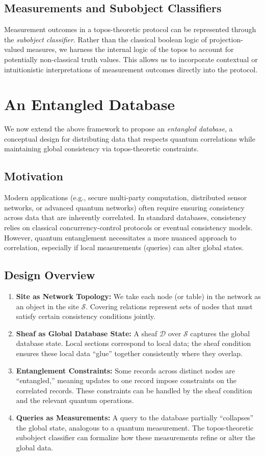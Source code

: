\documentclass[11pt]{article}
\begin{document}
\subsection{Measurements and Subobject Classifiers}
Measurement outcomes in a topos-theoretic protocol can be represented through the \emph{subobject classifier}. Rather than the classical boolean logic of projection-valued measures, we harness the internal logic of the topos to account for potentially non-classical truth values. This allows us to incorporate contextual or intuitionistic interpretations of measurement outcomes directly into the protocol.

\section{An Entangled Database}\label{sec:entangled_database}
We now extend the above framework to propose an \emph{entangled database}, a conceptual design for distributing data that respects quantum correlations while maintaining global consistency via topos-theoretic constraints.

\subsection{Motivation}
Modern applications (e.g., secure multi-party computation, distributed sensor networks, or advanced quantum networks) often require ensuring consistency across data that are inherently correlated. In standard databases, consistency relies on classical concurrency-control protocols or eventual consistency models. However, quantum entanglement necessitates a more nuanced approach to correlation, especially if local measurements (queries) can alter global states.

\subsection{Design Overview}
\begin{enumerate}[label=(\roman*)]
    \item \textbf{Site as Network Topology:} We take each node (or table) in the network as an object in the site $\mathcal{S}$. Covering relations represent sets of nodes that must satisfy certain consistency conditions jointly.
    \item \textbf{Sheaf as Global Database State:} A sheaf $\mathcal{D}$ over $\mathcal{S}$ captures the global database state. Local sections correspond to local data; the sheaf condition ensures these local data ``glue'' together consistently where they overlap.
    \item \textbf{Entanglement Constraints:} Some records across distinct nodes are ``entangled,'' meaning updates to one record impose constraints on the correlated records. These constraints can be handled by the sheaf condition and the relevant quantum operations.
    \item \textbf{Queries as Measurements:} A query to the database partially ``collapses'' the global state, analogous to a quantum measurement. The topos-theoretic subobject classifier can formalize how these measurements refine or alter the global data.
\end{enumerate}
\end{document}
